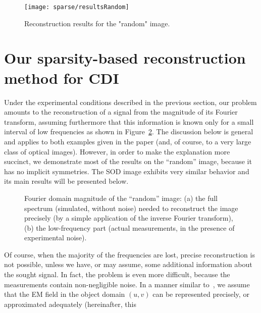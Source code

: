 \begin{figure}[H]
  \centering
\texttt{[image: sparse/resultsRandom]}
  \caption{Reconstruction results for the "random" image.}
  \label{fig:random-main-results}
\end{figure}



\section{Our sparsity-based reconstruction method for CDI}
\label{sec:reconstr-meth}
Under the experimental conditions described in the previous section,
our problem amounts to the reconstruction of a signal from the
magnitude of its Fourier transform, assuming furthermore that this
information is known only for a small interval of low frequencies as
shown in Figure~\ref{fig:fourier-data}. The discussion below is
general and applies to both examples given in the paper (and, of
course, to a very large class of optical images). However, in order to
make the explanation more succinct, we demonstrate most of the results
on the ``random'' image, because it has no implicit symmetries. The
SOD image exhibits very similar behavior and its main results will be
presented
below.%
\begin{figure}[H]
  \centering
  \qquad{}%
  \caption[Fourier domain magnitude of the ``random'' image]{Fourier domain magnitude of the ``random'' image: (a) the
    full spectrum (simulated, without noise) needed to reconstruct the
    image precisely (by a simple application of the inverse Fourier
    transform), (b) the low-frequency part (actual measurements, in
    the presence of experimental noise).}
  \label{fig:fourier-data}
\end{figure}
Of course, when the majority of the frequencies are lost, precise
reconstruction is not possible, unless we have, or may assume, some
additional information about the sought signal. In fact, the problem
is even more difficult, because the measurements contain non-negligible
noise.  In a manner similar to~, we
assume that the EM field in the object domain $(u,v)$ can be
represented precisely, or approximated adequately (hereinafter, this
